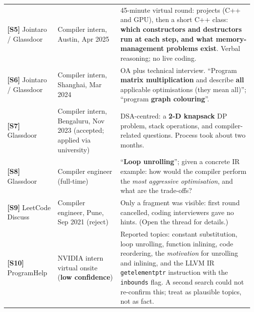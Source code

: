\documentclass[10pt,a4paper,openany,oneside]{report}
\begin{document}
{\begin{longtable}{@{}>{\raggedright\arraybackslash}p{2.1cm}>{\raggedright\arraybackslash}p{3.1cm}p{10.6cm}@{}}
\textbf{[S5]} Jointaro / Glassdoor & Compiler intern, Austin, Apr 2025 &
 45-minute virtual round: projects (C++ and GPU), then a short C++ class: \textbf{which constructors and destructors run at each step, and what
 memory-management problems exist}. Verbal reasoning; no live coding.\\
\textbf{[S6]} Jointaro / Glassdoor & Compiler intern, Shanghai, Mar 2024 &
 OA plus technical interview. ``Program \textbf{matrix multiplication} and describe \textbf{all} applicable optimisations (they mean all)''; ``program
 \textbf{graph colouring}''.\\
\textbf{[S7]} Glassdoor & Compiler intern, Bengaluru, Nov 2023 (accepted; applied via university) &
 DSA-centred: a \textbf{2-D knapsack} DP problem, stack operations, and compiler-related questions. Process took about two months.\\
\textbf{[S8]} Glassdoor & Compiler engineer (full-time) &
 ``\textbf{Loop unrolling}''; given a concrete IR example: how would the compiler perform the \emph{most aggressive optimisation}, and what are the trade-offs?\\
\textbf{[S9]} LeetCode Discuss & Compiler engineer, Pune, Sep 2021 (reject) &
 Only a fragment was visible: first round cancelled, coding interviewers gave no hints. (Open the thread for details.)\\
\textbf{[S10]} ProgramHelp & NVIDIA intern virtual onsite (\textbf{low confidence}) &
 Reported topics: constant substitution, loop unrolling, function inlining, code reordering, the \emph{motivation} for unrolling and inlining, and the LLVM IR
 \texttt{getelementptr} instruction with the \texttt{inbounds} flag. A second search could not re-confirm this; treat as plausible topics, not as fact.\\
\bottomrule
\end{longtable}}
\end{document}
